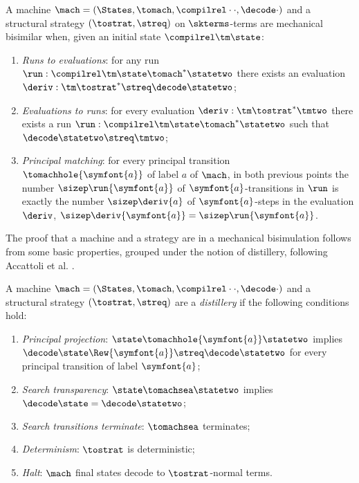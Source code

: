 \begin{definition}
\label{def:implem}
A machine $\mach=(\States, \tomach, \compilrel\cdot\cdot, \decode\cdot)$ and a structural strategy $(\tostrat,\streq)$ on $\skterms$-terms are mechanical bisimilar when, given an initial state $\compilrel\tm\state$:
\begin{enumerate}
\item \emph{Runs to evaluations}: for any run $\run: \compilrel\tm\state \tomach^* \statetwo$ there exists an evaluation $\deriv: \tm \tostrat^* \streq\decode\statetwo$;

\item \emph{Evaluations to runs}: for every evaluation $\deriv: \tm \tostrat^* \tmtwo$ there exists a 
run $\run: \compilrel\tm\state \tomach^* \statetwo$ such that $\decode\statetwo \streq \tmtwo$;

\item \emph{Principal matching}: for every principal transition $\tomachhole{\symfont{a}}$ of label $a$ of $\mach$, in both previous points the number $\sizep\run{\symfont{a}}$ of $\symfont{a}$-transitions in $\run$ is exactly the number $\sizep\deriv{a}$ of $\symfont{a}$-steps in the evaluation $\deriv$, \ie $\sizep\deriv{\symfont{a}} = \sizep\run{\symfont{a}}$.
\end{enumerate}
\end{definition}

The proof that a machine and a strategy are in a mechanical bisimulation follows from some basic properties, grouped under the notion of distillery, following Accattoli et al. \cite{DBLP:conf/icfp/AccattoliBM14}.
\begin{definition}[Distillery]
  \label{def:distillery}
  A machine $\mach=(\States, \tomach, \compilrel\cdot\cdot, \decode\cdot)$ and a structural strategy $(\tostrat,\streq)$ are a \emph{distillery} if the following conditions hold:
  \begin{enumerate}
		\item\label{p:def-beta-projection} \emph{Principal projection}: $\state \tomachhole{\symfont{a}} \statetwo$ implies $\decode\state \Rew{\symfont{a}} \streq\decode\statetwo$ for every principal transition of label $\symfont{a}$;
		\item\label{p:def-overhead-transparency} \emph{Search transparency}: $\state \tomachsea \statetwo$ implies $\decode\state = \decode\statetwo$;
		\item\label{p:def-overhead-terminate}	\emph{Search transitions terminate}:  $\tomachsea$ terminates;

	\item\label{p:def-determinism} \emph{Determinism}: $\tostrat$ is deterministic;

	\item\label{p:def-progress} \emph{Halt}: $\mach$ final states decode to $\tostrat$-normal terms.
  \end{enumerate}
\end{definition}


